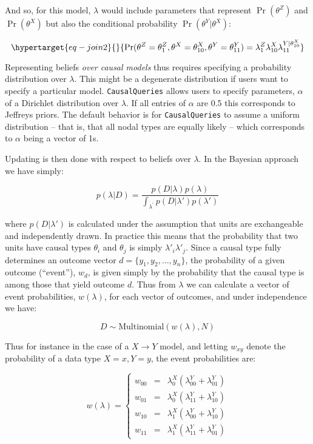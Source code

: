 \documentclass[
  11pt,
  article]{jss}
\begin{document}
And so, for this model, \(\lambda\) would include parameters that
represent \(\Pr(\theta^Z)\) and \(\Pr(\theta^X)\) but also the
conditional probability \(\Pr(\theta^Y|\theta^X)\):

\begin{equation}\protect\hypertarget{eq-join2}{}{
\Pr(\theta^Z = \theta^Z_1, \theta^X = \theta^X_{10}, \theta^Y = \theta^Y_{11}) = 
\lambda^Z_1\lambda^X_{10}\lambda^{Y|\theta^X_{10}}_{11}
}\label{eq-join2}\end{equation}

Representing beliefs \emph{over causal models} thus requires specifying
a probability distribution over \(\lambda\). This might be a degenerate
distribution if users want to specify a particular model.
\texttt{CausalQueries} allows users to specify parameters, \(\alpha\) of
a Dirichlet distribution over \(\lambda\). If all entries of \(\alpha\)
are 0.5 this corresponds to Jeffreys priors. The default behavior is for
\texttt{CausalQueries} to assume a uniform distribution -- that is, that
all nodal types are equally likely -- which corresponds to \(\alpha\)
being a vector of 1s.

Updating is then done with respect to beliefs over \(\lambda\). In the
Bayesian approach we have simply:

\[p(\lambda|D) = \frac{p(D|\lambda)p(\lambda)}{\int_{\lambda^{'}} p(D|\lambda')p(\lambda')}\]

where \(p(D|\lambda')\) is calculated under the assumption that units
are exchangeable and independently drawn. In practice this means that
the probability that two units have causal types \(\theta_i\) and
\(\theta_j\) is simply \(\lambda'_i\lambda'_j\). Since a causal type
fully determines an outcome vector \(d = \{y_1, y_2,\dots,y_n\}\), the
probability of a given outcome (``event''), \(w_d\), is given simply by
the probability that the causal type is among those that yield outcome
\(d\). Thus from \(\lambda\) we can calculate a vector of event
probabilities, \(w(\lambda)\), for each vector of outcomes, and under
independence we have:

\[D \sim \text{Multinomial}(w(\lambda), N)\]

Thus for instance in the case of a \(X \rightarrow Y\) model, and
letting \(w_{xy}\) denote the probability of a data type \(X=x, Y=y\),
the event probabilities are:

\[w(\lambda) = \left\{\begin{array}{ccc} w_{00} & = & \lambda^X_0(\lambda^Y_{00} + \lambda^Y_{01})\\ 
w_{01} & = & \lambda^X_0(\lambda^Y_{11} + \lambda^Y_{10})\\
w_{10} & = & \lambda^X_1(\lambda^Y_{00} + \lambda^Y_{10})\\
w_{11} & = & \lambda^X_1(\lambda^Y_{11} + \lambda^Y_{01})\end{array} \right.\]
\end{document}
